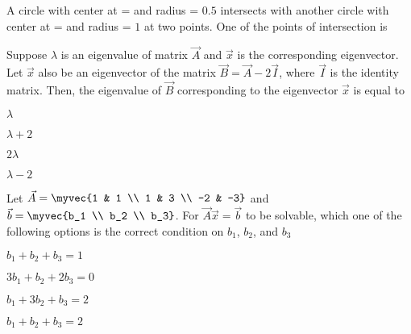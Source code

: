 \item A circle with center at  =  and radius = $0.5$ intersects with another circle with center at  =  and radius = $1$ at two points. One of the points of intersection  is
\hfill{}
\begin{enumerate}
    \begin{multicols}{4}
    \item {}
    \item {}
    \item {}
    \item {}
    \end{multicols}
\end{enumerate}
\item Suppose $\lambda$ is an eigenvalue of matrix $\vec{A}$ and $\vec{x}$ is the corresponding eigenvector. Let $\vec{x}$ also be an eigenvector of the matrix $\vec{B} = \vec{A} - 2\vec{I}$, where $\vec{I}$ is the identity matrix. Then, the eigenvalue of $\vec{B}$ corresponding to the eigenvector $\vec{x}$ is equal to
\hfill{}
\begin{enumerate}
    \begin{multicols}{4}
    \item $\lambda$
    \item $\lambda + 2$
    \item $2\lambda$
    \item $\lambda - 2$
    \end{multicols}
\end{enumerate}
\item Let $\vec{A} = \myvec{1 & 1 \\ 1 & 3 \\ -2 & -3}$ and $\vec{b} = \myvec{b_1 \\ b_2 \\ b_3}$. For $\vec{A}\vec{x}=\vec{b}$ to be solvable, which one of the following options is the correct condition on $b_1$, $b_2$, and $b_3$
\hfill{}
\begin{enumerate}
    \begin{multicols}{2}
    \item $b_1 + b_2 + b_3 = 1$
    \item $3b_1 + b_2 + 2b_3 = 0$
    \item $b_1 + 3b_2 + b_3 = 2$
    \item $b_1 + b_2 + b_3 = 2$
    \end{multicols}
\end{enumerate}
